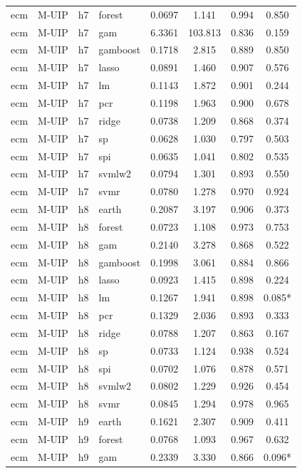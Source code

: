 \begin{ThreePartTable}
\begin{longtable}[t]{llclcccc}
ecm & M-UIP & h7 & forest & 0.0697 & 1.141 & 0.994 & 0.850\\
ecm & M-UIP & h7 & gam & 6.3361 & 103.813 & 0.836 & 0.159\\
ecm & M-UIP & h7 & gamboost & 0.1718 & 2.815 & 0.889 & 0.850\\
ecm & M-UIP & h7 & lasso & 0.0891 & 1.460 & 0.907 & 0.576\\
ecm & M-UIP & h7 & lm & 0.1143 & 1.872 & 0.901 & 0.244\\
ecm & M-UIP & h7 & pcr & 0.1198 & 1.963 & 0.900 & 0.678\\
ecm & M-UIP & h7 & ridge & 0.0738 & 1.209 & 0.868 & 0.374\\
ecm & M-UIP & h7 & sp & 0.0628 & 1.030 & 0.797 & 0.503\\
ecm & M-UIP & h7 & spi & 0.0635 & 1.041 & 0.802 & 0.535\\
ecm & M-UIP & h7 & svmlw2 & 0.0794 & 1.301 & 0.893 & 0.550\\
ecm & M-UIP & h7 & svmr & 0.0780 & 1.278 & 0.970 & 0.924\\
\addlinespace
ecm & M-UIP & h8 & earth & 0.2087 & 3.197 & 0.906 & 0.373\\
ecm & M-UIP & h8 & forest & 0.0723 & 1.108 & 0.973 & 0.753\\
ecm & M-UIP & h8 & gam & 0.2140 & 3.278 & 0.868 & 0.522\\
ecm & M-UIP & h8 & gamboost & 0.1998 & 3.061 & 0.884 & 0.866\\
ecm & M-UIP & h8 & lasso & 0.0923 & 1.415 & 0.898 & 0.224\\
ecm & M-UIP & h8 & lm & 0.1267 & 1.941 & 0.898 & 0.085*\\
ecm & M-UIP & h8 & pcr & 0.1329 & 2.036 & 0.893 & 0.333\\
ecm & M-UIP & h8 & ridge & 0.0788 & 1.207 & 0.863 & 0.167\\
ecm & M-UIP & h8 & sp & 0.0733 & 1.124 & 0.938 & 0.524\\
ecm & M-UIP & h8 & spi & 0.0702 & 1.076 & 0.878 & 0.571\\
ecm & M-UIP & h8 & svmlw2 & 0.0802 & 1.229 & 0.926 & 0.454\\
ecm & M-UIP & h8 & svmr & 0.0845 & 1.294 & 0.978 & 0.965\\
\addlinespace
ecm & M-UIP & h9 & earth & 0.1621 & 2.307 & 0.909 & 0.411\\
ecm & M-UIP & h9 & forest & 0.0768 & 1.093 & 0.967 & 0.632\\
ecm & M-UIP & h9 & gam & 0.2339 & 3.330 & 0.866 & 0.096*\\

\end{longtable}
\end{ThreePartTable}
